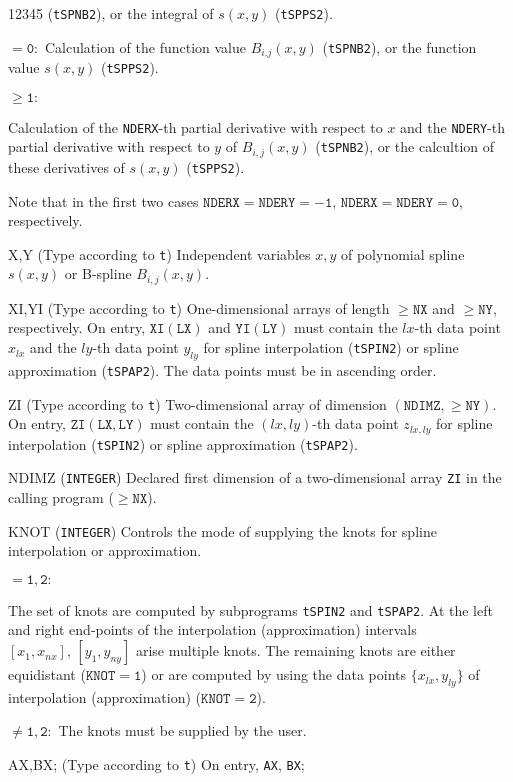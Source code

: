 \begin{DLtt}{12345}
({\tt tSPNB2}), or the integral of $s(x,y)$ ({\tt tSPPS2}).
\item[] $\mathtt{=0:}$
Calculation of the function value $B_{i.j}(x,y)$
({\tt tSPNB2}), or the function value $s(x,y)$ ({\tt tSPPS2}).
\item[] $\mathtt{\ge 1:}$ \parbox[t]{141mm}{
Calculation of the {\tt NDERX}-th partial derivative
with respect to $x$ and the {\tt NDERY}-th partial derivative with
respect to $y$ of $B_{i,j}(x,y)$ ({\tt tSPNB2}),
or the calcultion of these derivatives of $s(x,y)$ ({\tt tSPPS2}).}
\item[] Note that in the first two cases
$\mathtt{NDERX=NDERY=-1,\,NDERX=NDERY=0}$, respectively.
\item[X,Y] (Type according to {\tt t}) Independent variables $x,y$ of
polynomial spline $s(x,y)$ or B-spline $B_{i,j}(x,y)$.
\item[XI,YI] (Type according to {\tt t}) One-dimensional arrays of
length $\mathtt{\ge NX}$ and $\mathtt{\ge NY}$, respectively.
On entry, $\mathtt{XI(LX)}$ and $\mathtt{YI(LY)}$ must contain the
$lx$-th data point $x_{lx}$ and the $ly$-th data point $y_{ly}$
for spline interpolation ({\tt tSPIN2}) or spline approximation
({\tt tSPAP2}). The data points must be in  ascending order.
\item[ZI] (Type according to {\tt t}) Two-dimensional array of dimension
 $\mathtt{(NDIMZ, \ge NY)}$. On entry, $\mathtt{ZI(LX,LY)}$ must contain
 the $(lx,ly)$-th data point $z_{lx,ly}$ for spline interpolation
 ({\tt tSPIN2}) or spline approximation ({\tt tSPAP2}).
\item[NDIMZ] ({\tt INTEGER}) Declared first dimension of a
two-dimensional array {\tt ZI} in the calling program
($\mathtt{\ge NX}$).
\item[KNOT] ({\tt INTEGER}) Controls the mode of supplying the knots
for spline interpolation or approximation.
\item[] $\mathtt{=1,2:}$ \parbox[t]{138mm}{
The set of knots are computed by subprograms {\tt tSPIN2} and
{\tt tSPAP2}.
At the left and right end-points of the interpolation (approximation)
intervals $[x_1,x_{nx}],\,[y_1,y_{ny}]$ arise multiple knots.
The remaining knots are either equidistant ($\mathtt{KNOT=1}$) or are
computed by using the data points $\{x_{lx},y_{ly}\}$ of
interpolation (approximation) ($\mathtt{KNOT=2}$).}
\item[] $\mathtt{\ne 1,2:}$
The knots must be supplied by the user.
\item[AX,BX;] (Type according to {\tt t}) On entry, {\tt AX}, {\tt BX};

\end{DLtt}
